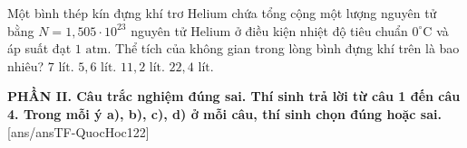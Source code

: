 \begin{ex}%
	Một bình thép kín đựng khí trơ Helium chứa tổng cộng một lượng nguyên tử bằng $N = 1,505 \cdot 10^{23}$ nguyên tử Helium ở điều kiện nhiệt độ tiêu chuẩn $0^\circ\text{C}$ và áp suất đạt $1\text{ atm}$. Thể tích của không gian trong lòng bình đựng khí trên là bao nhiêu?
	\choice
	{$7\text{ lít}$.}
	{\True $5,6\text{ lít}$.}
	{$11,2\text{ lít}$.}
	{$22,4\text{ lít}$.}
\end{ex}


\noindent \textbf{PHẦN II. Câu trắc nghiệm đúng sai. Thí sinh trả lời từ câu 1 đến câu 4. Trong mỗi ý a), b), c), d) ở mỗi câu, thí sinh chọn đúng hoặc sai.}
[ans/ansTF-QuocHoc122]

